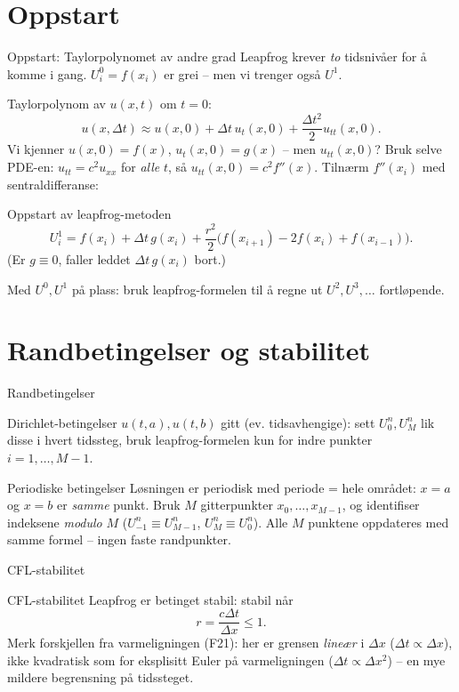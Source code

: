 \documentclass[11pt,aspectratio=169]{beamer}
\begin{document}
\section{Oppstart}

\begin{frame}{Oppstart: Taylorpolynomet av andre grad}
Leapfrog krever \emph{to} tidsnivåer for å komme i gang. $U_i^0=f(x_i)$ er grei -- men vi trenger også $U^1$.

Taylorpolynom av $u(x,t)$ om $t=0$:
\[
u(x,\Delta t) \approx u(x,0) + \Delta t\,u_t(x,0) + \frac{\Delta t^2}{2}u_{tt}(x,0).
\]
Vi kjenner $u(x,0)=f(x)$, $u_t(x,0)=g(x)$ -- men $u_{tt}(x,0)$? Bruk selve PDE-en: $u_{tt}=c^2u_{xx}$ for \emph{alle} $t$, så $u_{tt}(x,0)=c^2f''(x)$. Tilnærm $f''(x_i)$ med sentraldifferanse:
\begin{oppsumb}{Oppstart av leapfrog-metoden}
\[
U_i^1 = f(x_i) + \Delta t\,g(x_i) + \frac{r^2}{2}\big(f(x_{i+1})-2f(x_i)+f(x_{i-1})\big).
\]
(Er $g\equiv0$, faller leddet $\Delta t\,g(x_i)$ bort.)
\end{oppsumb}
Med $U^0,U^1$ på plass: bruk leapfrog-formelen til å regne ut $U^2,U^3,\ldots$ fortløpende.
\end{frame}

\section{Randbetingelser og stabilitet}

\begin{frame}{Randbetingelser}
\begin{defnb}{Dirichlet-betingelser}
$u(t,a),u(t,b)$ gitt (ev. tidsavhengige): sett $U_0^n,U_M^n$ lik disse i hvert tidssteg, bruk leapfrog-formelen kun for indre punkter $i=1,\ldots,M-1$.
\end{defnb}
\begin{defnb}{Periodiske betingelser}
Løsningen er periodisk med periode = hele området: $x=a$ og $x=b$ er \emph{samme} punkt. Bruk $M$ gitterpunkter $x_0,\ldots,x_{M-1}$, og identifiser indeksene \emph{modulo} $M$ ($U_{-1}^n\equiv U_{M-1}^n$, $U_M^n\equiv U_0^n$). Alle $M$ punktene oppdateres med samme formel -- ingen faste randpunkter.
\end{defnb}
\end{frame}

\begin{frame}{CFL-stabilitet}
\begin{remb}{CFL-stabilitet}
Leapfrog er betinget stabil: stabil når
\[
r = \frac{c\Delta t}{\Delta x} \leq 1.
\]
Merk forskjellen fra varmeligningen (F21): her er grensen \emph{lineær} i $\Delta x$ ($\Delta t\propto\Delta x$), ikke kvadratisk som for eksplisitt Euler på varmeligningen ($\Delta t\propto\Delta x^2$) -- en mye mildere begrensning på tidssteget.
\end{remb}
\end{frame}
\end{document}
